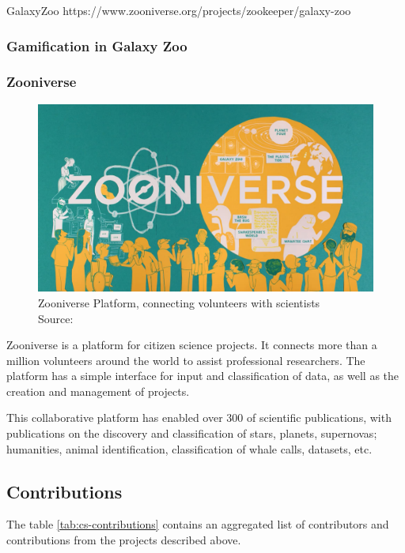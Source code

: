 GalaxyZoo 
https://www.zooniverse.org/projects/zookeeper/galaxy-zoo

\subsubsection{Gamification in Galaxy Zoo}

\subsubsection{Zooniverse}

\begin{figure}[ht]
    \centering
    \includegraphics[width=0.7\linewidth]{images/background/zooniverse.jpg}
    \caption{Zooniverse Platform, connecting volunteers with scientists \\ Source: \cite{zooniverse-logo}}
    \label{fig:foldit-solution}
\end{figure}

Zooniverse is a platform for citizen science projects. It connects more than a million volunteers around the world to assist professional researchers. The platform has a simple interface for input and classification of data, as well as the creation and management of projects.

This collaborative platform has enabled over 300 of scientific publications, with publications on the discovery and classification of stars, planets, supernovas; humanities, animal identification, classification of whale calls, datasets, etc.

\subsection{Contributions}

The table \ref{tab:cs-contributions} contains an aggregated list of contributors and contributions from the projects described above.

